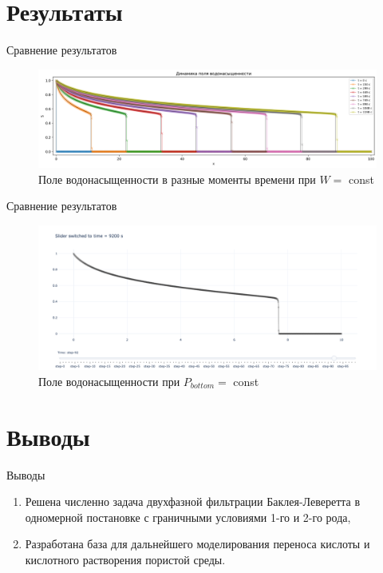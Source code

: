 \documentclass[14pt, aspectratio=169]{beamer}
\begin{document}
\section{Результаты}

\begin{frame} {Сравнение результатов}

    \begin{figure}
        \includegraphics[width=\linewidth]{upwind-solution.png}
        \caption{Поле водонасыщенности в разные моменты времени при $W=$ const}
    \end{figure}
    
\end{frame}

\begin{frame} {Сравнение результатов}

    \begin{figure}
        \includegraphics[width=.9\linewidth]{impes-solution.png}
        \caption{Поле водонасыщенности при $P_{bottom}=$ const}
    \end{figure}
    
\end{frame}

\section{Выводы}

\begin{frame} {Выводы}

    \begin{enumerate}
        \item Решена численно задача двухфазной фильтрации Баклея-Леверетта в одномерной постановке с граничными условиями 1-го и 2-го рода,
        \item Разработана база для дальнейшего моделирования переноса кислоты и кислотного растворения пористой среды.
    \end{enumerate}

\end{frame}
\end{document}
